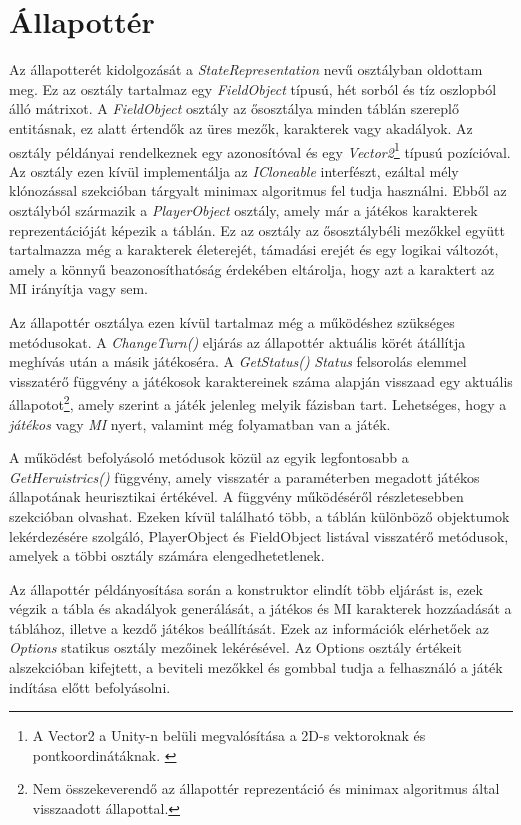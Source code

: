 \documentclass[
]{thesis-ekf}
\theoremstyle{definition}
\theoremstyle{remark}
\begin{document}
\section{Állapottér} \label{state}

Az állapotterét kidolgozását a \emph{StateRepresentation} nevű osztályban oldottam meg. Ez az osztály tartalmaz egy \emph{FieldObject} típusú, hét sorból és tíz oszlopból álló mátrixot. A \emph{FieldObject} osztály az ősosztálya minden táblán szereplő entitásnak, ez alatt értendők az üres mezők, karakterek vagy akadályok. Az osztály példányai rendelkeznek egy azonosítóval és egy \emph{Vector2}\footnote{A Vector2 a Unity-n belüli megvalósítása a 2D-s vektoroknak és pontkoordinátáknak. \cite{UnityDocsVector2}} típusú pozícióval. Az osztály ezen kívül implementálja az \emph{ICloneable} interfészt, ezáltal mély klónozással  szekcióban tárgyalt minimax algoritmus fel tudja használni. Ebből az osztályból származik a \emph{PlayerObject} osztály, amely már a játékos karakterek reprezentációját képezik a táblán. Ez az osztály az ősosztálybéli mezőkkel együtt tartalmazza még a karakterek életerejét, támadási erejét és egy logikai változót, amely a könnyű beazonosíthatóság érdekében eltárolja, hogy azt a karaktert az MI irányítja vagy sem.

Az állapottér osztálya ezen kívül tartalmaz még a működéshez szükséges metódusokat. A \emph{ChangeTurn()} eljárás az állapottér aktuális körét átállítja meghívás után a másik játékoséra. A \emph{GetStatus()} \emph{Status} felsorolás elemmel visszatérő függvény a játékosok karaktereinek száma alapján visszaad egy aktuális állapotot\footnote{Nem összekeverendő az állapottér reprezentáció és minimax algoritmus által visszaadott állapottal.}, amely szerint a játék jelenleg melyik fázisban tart. Lehetséges, hogy a \emph{játékos} vagy \emph{MI} nyert, valamint még folyamatban van a játék.

A működést befolyásoló metódusok közül az egyik legfontosabb a \emph{GetHeruistrics()} függvény, amely visszatér a paraméterben megadott játékos állapotának heurisztikai értékével. A függvény működéséről részletesebben  szekcióban olvashat. Ezeken kívül található több, a táblán különböző objektumok lekérdezésére szolgáló, PlayerObject és FieldObject listával visszatérő metódusok, amelyek a többi osztály számára elengedhetetlenek.

Az állapottér példányosítása során a konstruktor elindít több eljárást is, ezek végzik a tábla és akadályok generálását, a játékos és MI karakterek hozzáadását a táblához, illetve a kezdő játékos beállítását. Ezek az információk elérhetőek az \emph{Options} statikus osztály mezőinek lekérésével. Az Options osztály értékeit  alszekcióban kifejtett, a beviteli mezőkkel és gombbal tudja a felhasználó a játék indítása előtt befolyásolni.
\end{document}
